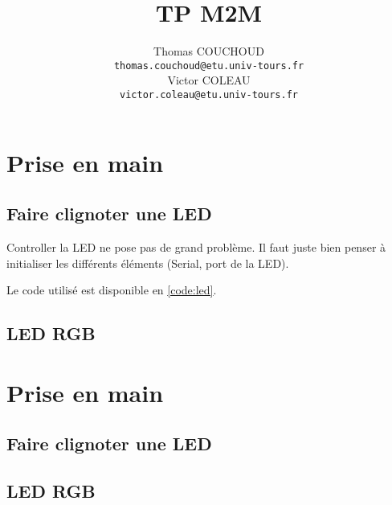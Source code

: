 \documentclass{report}
\title{TP M2M}
\author{Thomas COUCHOUD\\\texttt{thomas.couchoud@etu.univ-tours.fr}\\Victor COLEAU\\\texttt{victor.coleau@etu.univ-tours.fr}}
\begin{document}
	\mccTitle
	
	\chapter{Prise en main}
		\section{Faire clignoter une LED}
			Controller la LED ne pose pas de grand problème.
			Il faut juste bien penser à initialiser les différents éléments (Serial, port de la LED).
			
			Le code utilisé est disponible en \autoref{code:led}.
			
		\section{LED RGB}
			
			
			
\appendix
	\chapter{Prise en main}
		\section{Faire clignoter une LED\label{code:led}}
			
			
		\section{LED RGB}
			
\end{document}

